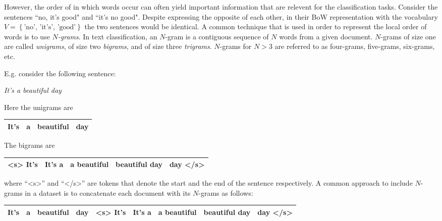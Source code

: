 However, the order of in which words occur can often yield important information
that are relevent for the classification tasks. Consider the sentences ``no,
it's good" and ``it's no good". Despite expressing the opposite of each other,
in their BoW representation with the vocabulary $V = \left\{\text{'no', 'it's', 'good'} \right\}$ 
the two sentences would be identical. 
A common technique that is used in order to represent the local order
of words is to use \emph{$N$-grams}. In text classification, an $N$-gram is a
contiguous sequence of $N$ words from a given document. $N$-grams of size one are called
\emph{unigrams}, of size two \emph{bigrams}, and of size three \emph{trigrams}.
$N$-grams for $N > 3$ are referred to as four-grams, five-grams, six-grams, etc. 

E.g. consider the following sentence:

\begin{center} 
\textit{It's a beautiful day}
\end{center} 

Here the unigrams are

\begin{center}
\begin{tabular}{|c|c|c|c|}
\hline 
It's & a & beautiful & day \\
\hline
\end{tabular}
\end{center}

The bigrams are 

\begin{center}
\begin{tabular}{|c|c|c|c|c|}
\hline 
<s> It's & It's a & a beautiful & beautiful day & day </s> \\
\hline
\end{tabular}
\end{center}

where ``<s>'' and ``</s>'' are tokens that denote the start and the end of the
sentence respectively. A common approach to include $N$-grams in a dataset is to
concatenate each document with its $N$-grams as follows: 

\begin{center}
\begin{tabular}{|c|c|c|c|c|c|c|c|c|}
\hline 
It's & a & beautiful & day & <s> It's & It's a & a beautiful & beautiful day &
 
day </s> \\
\hline
\end{tabular}
\end{center}

